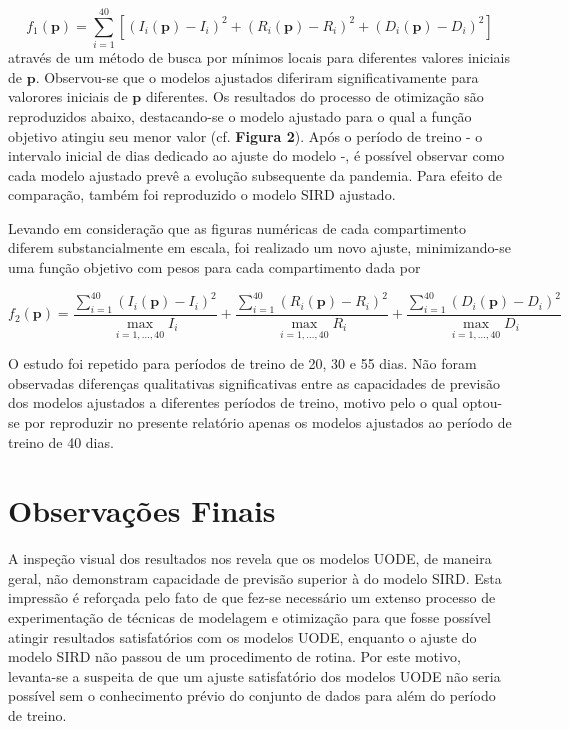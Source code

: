 \documentclass[a4paper,12pt]{article}
\begin{document}
$$ f_1(\mathbf{p}) = \sum\limits_{i=1}^{40} \left[(I_i(\mathbf{p})- I_i)^2 + (R_i(\mathbf{p})-R_i)^2 + (D_i(\mathbf{p})-D_i)^2\right] $$
através de um método de busca por mínimos locais para diferentes valores iniciais de $\mathbf{p}$. Observou-se que o modelos ajustados diferiram significativamente para valorores iniciais de $\mathbf{p}$ diferentes. Os resultados do processo de otimização são reproduzidos abaixo, destacando-se o modelo ajustado para o qual a função objetivo atingiu seu menor valor (cf. \textbf{Figura 2}). Após o período de treino - o intervalo inicial de dias dedicado ao ajuste do modelo -, é possível observar como cada modelo ajustado prevê a evolução subsequente da pandemia. Para efeito de comparação, também foi reproduzido o modelo SIRD ajustado.

Levando em consideração que as figuras numéricas de cada compartimento diferem substancialmente em escala, foi realizado um novo ajuste, minimizando-se uma função objetivo com pesos para cada compartimento dada por

$$ f_2(\mathbf{p}) = \frac{\sum\limits_{i=1}^{40} (I_i(\mathbf{p})- I_i)^2}{\max\limits_{i=1,\dots,40} I_i} + \frac{\sum\limits_{i=1}^{40} (R_i(\mathbf{p})- R_i)^2}{\max\limits_{i=1,\dots,40} R_i} + \frac{\sum\limits_{i=1}^{40} (D_i(\mathbf{p})- D_i)^2}{\max\limits_{i=1,\dots,40} D_i} $$

O estudo foi repetido para períodos de treino de 20, 30 e 55 dias. Não foram observadas diferenças qualitativas significativas entre as capacidades de previsão dos modelos ajustados a diferentes períodos de treino, motivo pelo o qual optou-se por reproduzir no presente relatório apenas os modelos ajustados ao período de treino de 40 dias. 


\section{Observações Finais}

A inspeção visual dos resultados nos revela que os modelos UODE, de maneira geral, não demonstram capacidade de previsão superior à do modelo SIRD. Esta impressão é reforçada pelo fato de que fez-se necessário um extenso processo de experimentação de técnicas de modelagem e otimização para que fosse possível atingir resultados satisfatórios com os modelos UODE, enquanto o ajuste do modelo SIRD não passou de um procedimento de rotina. Por este motivo, levanta-se a suspeita de que um ajuste satisfatório dos modelos UODE não seria possível sem o conhecimento prévio do conjunto de dados para além do período de treino.
\end{document}
